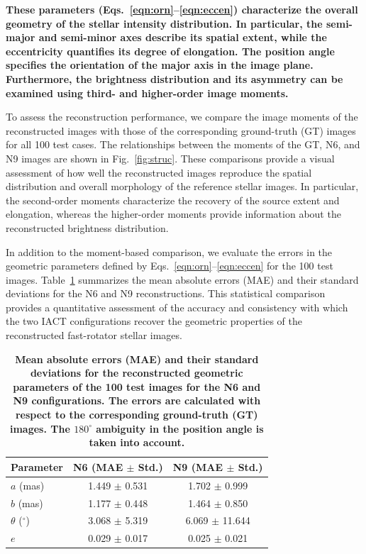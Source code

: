 {\bf These parameters (Eqs.~\ref{eqn:orn}--\ref{eqn:eccen}) characterize the overall geometry of the stellar intensity distribution. In particular, the semi-major and semi-minor axes describe its spatial extent, while the eccentricity quantifies its degree of elongation. The position angle specifies the orientation of the major axis in the image plane. Furthermore, the brightness distribution and its asymmetry can be examined using third- and higher-order image moments.
	
To assess the reconstruction performance, we compare the image moments of the reconstructed images with those of the corresponding ground-truth (GT) images for all 100 test cases. The relationships between the moments of the GT, N6, and N9 images are shown in Fig.~\ref{fig:struc}. These comparisons provide a visual assessment of how well the reconstructed images reproduce the spatial distribution and overall morphology of the reference stellar images. In particular, the second-order moments characterize the recovery of the source extent and elongation, whereas the higher-order moments provide information about the reconstructed brightness distribution.
	
In addition to the moment-based comparison, we evaluate the errors in the geometric parameters defined by Eqs.~\ref{eqn:orn}--\ref{eqn:eccen} for the 100 test images. Table~\ref{tab:errors} summarizes the mean absolute errors (MAE) and their standard deviations for the N6 and N9 reconstructions. This statistical comparison provides a quantitative assessment of the accuracy and consistency with which the two IACT configurations recover the geometric properties of the reconstructed fast-rotator stellar images.}

\begin{table}
	\centering
	\caption{{\bf Mean absolute errors (MAE) and their standard deviations for the reconstructed geometric parameters of the 100 test images for the N6 and N9 configurations. The errors are calculated with	respect to the corresponding ground-truth (GT) images. The $180^\circ$ ambiguity in the position angle is taken into account.}}
	\label{tab:errors}
	\begin{tabular}{lcc}
		\hline
		\hline
		Parameter & N6 (MAE $\pm$ Std.) & N9 (MAE $\pm$ Std.) \\
		\hline
		$a$ (mas) & 1.449 $\pm$ 0.531 & 1.702 $\pm$ 0.999\\
		$b$ (mas) & 1.177 $\pm$ 0.448 & 1.464 $\pm$ 0.850\\
		$\theta$ ($^\circ$) & 3.068 $\pm$ 5.319 & 6.069 $\pm$ 11.644 \\
	    $e$ & 0.029 $\pm$ 0.017 & 0.025 $\pm$ 0.021 \\
		\hline
		\hline
	\end{tabular}
\end{table}
